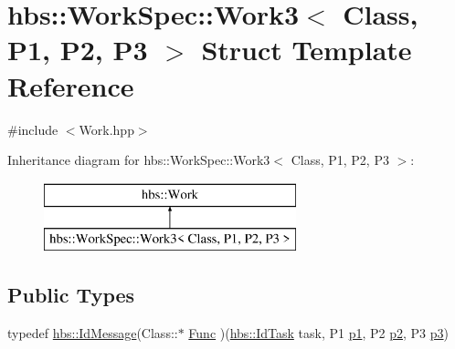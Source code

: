 \hypertarget{structhbs_1_1_work_spec_1_1_work3}{\section{hbs\-:\-:Work\-Spec\-:\-:Work3$<$ Class, P1, P2, P3 $>$ Struct Template Reference}
\label{structhbs_1_1_work_spec_1_1_work3}
}


{\ttfamily \#include $<$Work.\-hpp$>$}

Inheritance diagram for hbs\-:\-:Work\-Spec\-:\-:Work3$<$ Class, P1, P2, P3 $>$\-:\begin{figure}[H]
\begin{center}
\leavevmode
\includegraphics[height=2.000000cm]{structhbs_1_1_work_spec_1_1_work3}
\end{center}
\end{figure}
\subsection*{Public Types}
\begin{DoxyCompactItemize}
\item 
typedef \hyperlink{namespacehbs_a6d744a52db9bca0a9752a009118641f4}{hbs\-::\-Id\-Message}(Class\-::$\ast$ \hyperlink{structhbs_1_1_work_spec_1_1_work3_ac7ae1afe6f16d96d1832caaf6bd4a3d1}{Func} )(\hyperlink{namespacehbs_aab8d06205ac2b0b14186327fd6c1c0d6}{hbs\-::\-Id\-Task} task, P1 \hyperlink{structhbs_1_1_work_spec_1_1_work3_a0aaf6242c8e5e3a3db4a36b71eb160a2}{p1}, P2 \hyperlink{structhbs_1_1_work_spec_1_1_work3_a413cb2596ad3a67b8cce794e552e073b}{p2}, P3 \hyperlink{structhbs_1_1_work_spec_1_1_work3_a45be68e8c2138f0af59cbb3da42b9ea3}{p3})
\end{DoxyCompactItemize}

